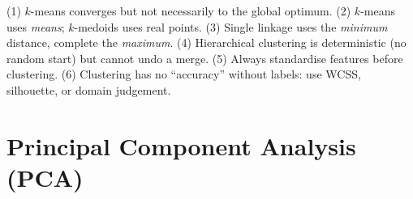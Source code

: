 \documentclass[11pt,a4paper]{article}
\begin{document}
\begin{center}
\end{center}
\begin{trap}
(1) $k$-means converges but not necessarily to the global optimum. (2) $k$-means uses \emph{means}; $k$-medoids uses real points. (3) Single linkage uses the \emph{minimum} distance, complete the \emph{maximum}. (4) Hierarchical clustering is deterministic (no random start) but cannot undo a merge. (5) Always standardise features before clustering. (6) Clustering has no ``accuracy'' without labels: use WCSS, silhouette, or domain judgement.
\end{trap}

\section{Principal Component Analysis (PCA)}
\end{document}
